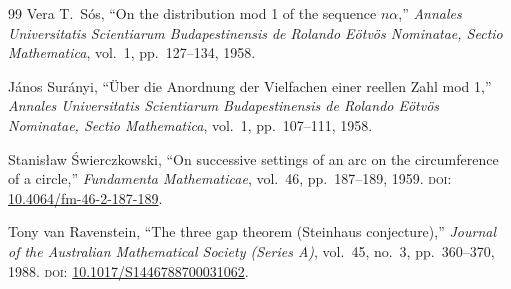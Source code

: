 \documentclass[11pt,reqno]{amsart}
\theoremstyle{plain}
\theoremstyle{definition}
\theoremstyle{remark}
\begin{document}
\begin{thebibliography}{99}
Vera T.\ S\'{o}s,
``On the distribution mod 1 of the sequence \(n\alpha\),''
\emph{Annales Universitatis Scientiarum Budapestinensis de Rolando
E\"{o}tv\"{o}s Nominatae, Sectio Mathematica}, vol.~1, pp.~127--134, 1958.

J\'{a}nos Sur\'{a}nyi,
``\"{U}ber die Anordnung der Vielfachen einer reellen Zahl mod 1,''
\emph{Annales Universitatis Scientiarum Budapestinensis de Rolando
E\"{o}tv\"{o}s Nominatae, Sectio Mathematica}, vol.~1, pp.~107--111, 1958.

Stanis{\l}aw \'{S}wierczkowski,
``On successive settings of an arc on the circumference of a circle,''
\emph{Fundamenta Mathematicae}, vol.~46, pp.~187--189, 1959.
\textsc{doi}: \href{https://doi.org/10.4064/fm-46-2-187-189}%
{10.4064/fm-46-2-187-189}.

Tony van Ravenstein,
``The three gap theorem (Steinhaus conjecture),''
\emph{Journal of the Australian Mathematical Society (Series A)},
vol.~45, no.~3, pp.~360--370, 1988.
\textsc{doi}: \href{https://doi.org/10.1017/S1446788700031062}%
{10.1017/S1446788700031062}.

\end{thebibliography}
\end{document}
